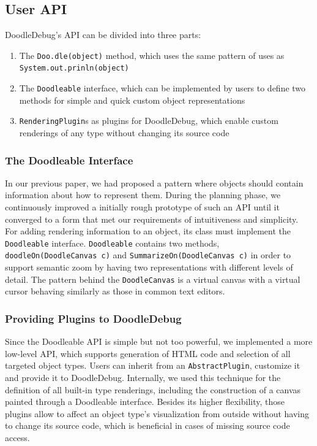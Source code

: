\documentclass[english]{acm_proc_article-sp}
\begin{document}
\subsection{User API}
DoodleDebug's API can be divided into three parts:
\begin{enumerate}
\item The \verb-Doo.dle(object)- method, which uses the same pattern of uses as \verb-System.out.prinln(object)-
\item The \verb.Doodleable. interface, which can be implemented by users to define two methods for simple and quick custom object representations
\item \verb.RenderingPlugin.s as plugins for DoodleDebug, which enable custom renderings of any type without changing its source code
\end{enumerate}

\subsubsection{The Doodleable Interface}
In our previous paper, we had proposed a pattern where objects should contain information about how to represent them. During the planning phase, we continuously improved a initially rough prototype of such an API until it converged to a form that met our requirements of intuitiveness and simplicity. For adding rendering information to an object, its class must implement the \verb.Doodleable. interface. \verb.Doodleable. contains two methods, \verb.doodleOn(DoodleCanvas c). and \verb.SummarizeOn(DoodleCanvas c). in order to support semantic zoom by having two representations with different levels of detail. The pattern behind the \verb.DoodleCanvas. is a virtual canvas with a virtual cursor behaving similarly as those in common text editors.

\subsubsection{Providing Plugins to DoodleDebug}
Since the Doodleable API is simple but not too powerful, we implemented a more low-level API, which supports generation of HTML code and selection of all targeted object types. Users can inherit from an \verb.AbstractPlugin., customize it and provide it to DoodleDebug. Internally, we used this technique for the definition of all built-in type renderings, including the construction of a canvas painted through a Doodleable interface. Besides its higher flexibility, those plugins allow to affect an object type's visualization from outside without having to change its source code, which is beneficial in cases of missing source code access.
\end{document}
